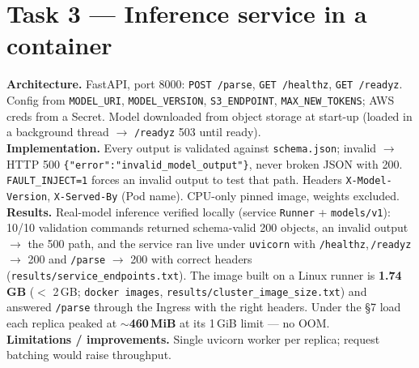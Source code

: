 \documentclass[10pt,a4paper]{article}
\newcommand{\code}[1]{\texttt{\small #1}}
\begin{document}
\section{Task 3 --- Inference service in a container}
\textbf{Architecture.} FastAPI, port 8000: \code{POST /parse}, \code{GET /healthz}, \code{GET /readyz}.
Config from \code{MODEL\_URI}, \code{MODEL\_VERSION}, \code{S3\_ENDPOINT}, \code{MAX\_NEW\_TOKENS}; AWS creds
from a Secret. Model downloaded from object storage at start-up (loaded in a background thread
$\rightarrow$ \code{/readyz} 503 until ready).\\
\textbf{Implementation.} Every output is validated against \code{schema.json}; invalid $\rightarrow$ HTTP 500
\code{\{"error":"invalid\_model\_output"\}}, never broken JSON with 200. \code{FAULT\_INJECT=1} forces an
invalid output to test that path. Headers \code{X-Model-Version}, \code{X-Served-By} (Pod name). CPU-only
pinned image, weights excluded.\\
\textbf{Results.} Real-model inference verified locally (service \code{Runner} + \code{models/v1}): 10/10
validation commands returned schema-valid 200 objects, an invalid output $\rightarrow$ the 500 path, and the
service ran live under \code{uvicorn} with \code{/healthz},\,\code{/readyz} $\rightarrow$ 200 and
\code{/parse} $\rightarrow$ 200 with correct headers (\code{results/service\_endpoints.txt}). The image
built on a Linux runner is \textbf{1.74\,GB} ($<$ 2\,GB; \code{docker images},
\code{results/cluster\_image\_size.txt}) and answered \code{/parse} through the Ingress with the right
headers. Under the \S7 load each replica peaked at $\sim$\textbf{460\,MiB} at its 1\,GiB limit --- no OOM.\\
\textbf{Limitations / improvements.} Single uvicorn worker per replica; request batching would raise
throughput.
\end{document}
